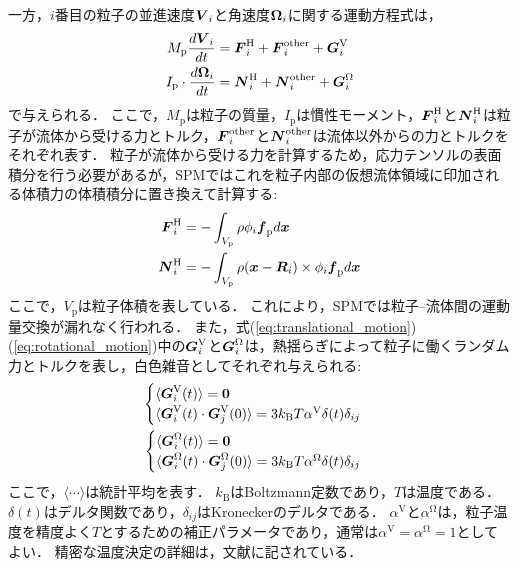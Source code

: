 \documentclass[pdflatex,a4paper,10pt,ja=standard]{bxjsarticle}
\def\vec#1{\mbox{\boldmath $#1$}}
\begin{document}
一方，$i$番目の粒子の並進速度$\vec{V}_{i}$と角速度$\vec{\Omega}_{i}$に関する運動方程式は，
\begin{align}
    M_{\mathrm p}  \frac{d \vec{V}_{i}}{d t} &= \vec{F}_{i}^{\mathrm H} + \vec{F}_{i}^{\mathrm {other}} + \vec{G}_{i}^{\mathrm V} \label{eq:translational_motion}\\
    I_{\mathrm p} \cdot \frac{d \vec{\Omega}_{i}}{d t} &= \vec{N}_{i}^{\mathrm H} + \vec{N}_{i}^{\mathrm {other}} + \vec{G}_{i}^{\mathrm \Omega} \label{eq:rotational_motion}
\end{align}
で与えられる．
ここで，$M_{\mathrm p}$は粒子の質量，$I_{\mathrm p}$は慣性モーメント，$\vec{F}_{i}^{\mathrm H}$と$\vec{N}_{i}^{\mathrm H}$は粒子が流体から受ける力とトルク，$\vec{F}_{i}^{\mathrm {other}}$と$\vec{N}_{i}^{\mathrm {other}}$は流体以外からの力とトルクをそれぞれ表す．
粒子が流体から受ける力を計算するため，応力テンソルの表面積分を行う必要があるが，SPMではこれを粒子内部の仮想流体領域に印加される体積力の体積積分に置き換えて計算する:
\begin{align}
    \vec{F}_{i}^{\mathrm{H}} &= - \int_{V_{\mathrm p}} \rho \phi_{i} \vec{f}_{\mathrm p} d \vec{x} \\
    \vec{N}_{i}^{\mathrm{H}} &= - \int_{V_{\mathrm p}} \rho (\vec{x} - \vec{R}_{i}) \times \phi_{i} \vec{f}_{\mathrm p} d \vec{x}
\end{align}
ここで，$V_{\mathrm p}$は粒子体積を表している．
これにより，SPMでは粒子--流体間の運動量交換が漏れなく行われる．
また，式(\ref{eq:translational_motion})(\ref{eq:rotational_motion})中の$\vec{G}_{i}^{\mathrm V}$と$\vec{G}_{i}^{\mathrm \Omega}$は，熱揺らぎによって粒子に働くランダム力とトルクを表し，白色雑音としてそれぞれ与えられる:
\begin{align}
    \begin{cases}
    \langle \vec{G}_{i}^{\mathrm V} (t) \rangle = \vec{0} \\
    \langle \vec{G}_{i}^{\mathrm V} (t) \cdot \vec{G}_{j}^{\mathrm V} (0)\rangle = 3 k_{\mathrm B} T \alpha^{\mathrm V} \delta(t) \delta_{ij} 
    \end{cases}\\
    \begin{cases}
        \langle \vec{G}_{i}^{\mathrm \Omega} (t) \rangle = \vec{0} \\
        \langle \vec{G}_{i}^{\mathrm \Omega} (t) \cdot \vec{G}_{j}^{\mathrm \Omega} (0)\rangle = 3 k_{\mathrm B} T \alpha^{\mathrm \Omega} \delta(t) \delta_{ij} 
        \end{cases}
\end{align}
ここで，$\langle \cdots \rangle$は統計平均を表す．
$k_{\mathrm B}$はBoltzmann定数であり，$T$は温度である．
$\delta(t)$はデルタ関数であり，$\delta_{ij}$はKroneckerのデルタである．
$\alpha^{\mathrm V}$と$\alpha^{\mathrm \Omega}$は，粒子温度を精度よく$T$とするための補正パラメータであり，通常は$\alpha^{\mathrm V} = \alpha^{\mathrm \Omega} = 1$としてよい．
精密な温度決定の詳細は，文献\autocite{iwashita2008numerical,iwashita2009short}に記されている．
\end{document}
